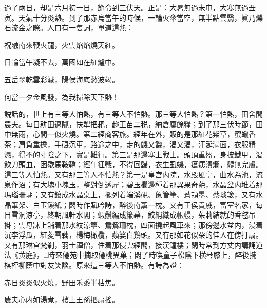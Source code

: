 過了兩日，却是六月初一日，節令到三伏天。正是：大暑無過未申，大寒無過丑寅。天氣十分炎熱。到了那赤烏當午的時候，一輪火傘當空，無半點雲翳，眞乃爍石流金之際。人口有一隻詞，單道這熱：

\begin{myquote}
祝融南來鞭火龍，火雲焰焰燒天紅。

日輪當午凝不去，萬國如在紅爐中。

五岳翠乾雲彩滅，陽侯海底愁波竭。

何當一夕金風發，為我掃除天下熱！
\end{myquote}

説話的，世上有三等人怕熱，有三等人不怕熱。那三等人怕熱？第一怕熱，田舍間農夫。每日耕田邁隴，扶犁把耙，趂王苗二税，納倉廩餘糧；到了那三伏時節，田中無雨，心間一似火燒。第二經商客旅。經年在外，販的是那紅花紫草，蜜蠟香茶；肩負重擔，手碾沉車，路途之中，走的饑又饑，渴又渴，汗涎滿面，衣服精濕，得不的寸陰之下，實是難行。第三是那邊塞上戰士。頭頂重盔，身披鐵甲，渴飲刀頭血，困歇馬鞍鞽；經年征戰，不得回歸，衣生虱蟣，瘡痍潰爛，體無完膚。這三等人怕熱。又有那三等人不怕熱？第一是皇宫内院，水殿風亭，曲水為池，流泉作沼；有大塊小塊玉，整對倒透犀；碧玉欄邊種着那異果奇葩，水晶盆内堆着那瑪瑙珊瑚；又有鑲成水晶桌上，擺列着端溪硯、象管筆、蒼頡墨、蔡琰箋，又有水晶筆架、白玉鎭紙；悶時作賦吟詩，醉後南薰一枕。又有王侯貴戚，富室名家，每日雪洞涼亭，終朝風軒水閣；蝦鬚編成簾幕，鮫綃織成帳幔，茱莉結就的香毬吊掛；雲母牀上舖着那水紋涼簟、鴦鴛珊枕，四面撓起風車來；那傍邊水盆内，浸着沉李浮瓜，紅菱雪藕，楊梅橄欖，蘋婆白鷄頭。又有那如花似朶的佳人在傍打扇。又有那琳宫梵剎，羽士禪僧，住着那侵雲經閣，接漢鐘樓；閑時常到方丈内講誦道法《黄庭》，□時來僊苑中摘取僊桃異菓；悶了時喚童子松陰下横琴膝上，醉後携棋枰柳蔭中對友笑談。原來這三等人不怕熱。有詩為證：

\begin{myquote}
赤日炎炎似火燒，野田禾黍半枯焦。

農夫心内如湯煮，樓上王孫把扇搖。
\end{myquote}

